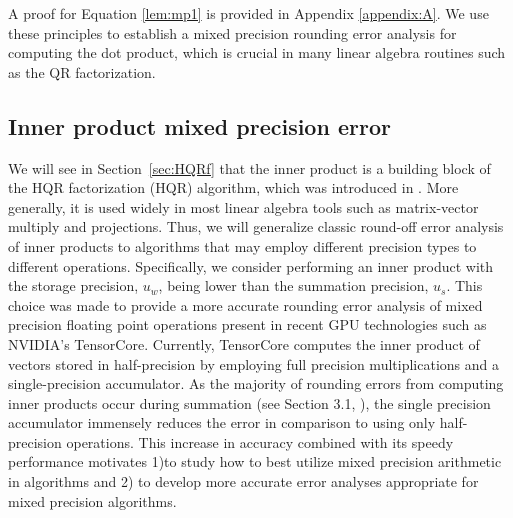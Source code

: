 A proof for Equation \ref{lem:mp1} is provided in Appendix \ref{appendix:A}.
We use these principles to establish a mixed precision rounding error analysis for computing the dot product, which is crucial in many linear algebra routines such as the QR factorization.
\subsection{Inner product mixed precision error}
\label{ssec:IP}
We will see in Section~\ref{sec:HQRf} that the inner product is a building block of the HQR factorization (HQR) algorithm, which was introduced in \cite{Householder1958}.
More generally, it is used widely in most linear algebra tools such as matrix-vector multiply and projections.
Thus, we will generalize classic round-off error analysis of inner products to algorithms that may employ different precision types to different operations. 
Specifically, we consider performing an inner product with the storage precision, $u_w$, being lower than the summation precision, $u_s$.
This choice was made to provide a more accurate rounding error analysis of mixed precision floating point operations present in recent GPU technologies such as NVIDIA's TensorCore. 
Currently, TensorCore computes the inner product of vectors stored in half-precision by employing full precision multiplications and a single-precision accumulator. 
As the majority of rounding errors from computing inner products occur during summation (see Section 3.1, \cite{Higham2002}), the single precision accumulator immensely reduces the error in comparison to using only half-precision operations.
This increase in accuracy combined with its speedy performance motivates 1)to study how to best utilize mixed precision arithmetic in algorithms and 2) to develop more accurate error analyses appropriate for mixed precision algorithms.


